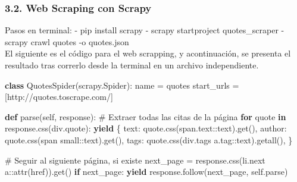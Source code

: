 \documentclass[
  letterpaper,
  DIV=11,
  numbers=noendperiod]{scrartcl}
\makeatletter
\newenvironment{Shaded}{\begin{snugshade}}{\end{snugshade}}
\newcommand{\CommentTok}[1]{\textcolor[rgb]{0.37,0.37,0.37}{#1}}
\newcommand{\ControlFlowTok}[1]{\textcolor[rgb]{0.00,0.23,0.31}{\textbf{#1}}}
\newcommand{\KeywordTok}[1]{\textcolor[rgb]{0.00,0.23,0.31}{\textbf{#1}}}
\newcommand{\NormalTok}[1]{\textcolor[rgb]{0.00,0.23,0.31}{#1}}
\newcommand{\OperatorTok}[1]{\textcolor[rgb]{0.37,0.37,0.37}{#1}}
\newcommand{\StringTok}[1]{\textcolor[rgb]{0.13,0.47,0.30}{#1}}
\newcommand{\VariableTok}[1]{\textcolor[rgb]{0.07,0.07,0.07}{#1}}
\newcommand*\pandocbounded[1]{%
  \sbox\pandoc@box{#1}%
  \Gscale@div\@tempa{\textheight}{\dimexpr\ht\pandoc@box+\dp\pandoc@box\relax}%
  \Gscale@div\@tempb{\linewidth}{\wd\pandoc@box}%
  \ifdim\@tempb\p@<\@tempa\p@\let\@tempa\@tempb\fi%
  \ifdim\@tempa\p@<\p@\scalebox{\@tempa}{\usebox\pandoc@box}%
  \else\usebox{\pandoc@box}%
  \fi%
}
\makeatother
\begin{document}
\pandocbounded{\texttt{[image: Imagen1.png]}}

\subsubsection{3.2. Web Scraping con
Scrapy}\label{web-scraping-con-scrapy}

Pasos en terminal: - pip install scrapy - scrapy startproject
quotes\_scraper - scrapy crawl quotes -o quotes.json\\
El siguiente es el código para el web scrapping, y acontinuación, se
presenta el resultado tras correrlo desde la terminal en un archivo
independiente.

\begin{Shaded}
\begin{Highlighting}[]

\KeywordTok{class}\NormalTok{ QuotesSpider(scrapy.Spider):}
\NormalTok{    name }\OperatorTok{=} \StringTok{\textquotesingle{}quotes\textquotesingle{}}
\NormalTok{    start\_urls }\OperatorTok{=}\NormalTok{ [}\StringTok{\textquotesingle{}http://quotes.toscrape.com/\textquotesingle{}}\NormalTok{]}

    \KeywordTok{def}\NormalTok{ parse(}\VariableTok{self}\NormalTok{, response):}
        \CommentTok{\# Extraer todas las citas de la página}
        \ControlFlowTok{for}\NormalTok{ quote }\KeywordTok{in}\NormalTok{ response.css(}\StringTok{\textquotesingle{}div.quote\textquotesingle{}}\NormalTok{):}
            \ControlFlowTok{yield}\NormalTok{ \{}
                \StringTok{\textquotesingle{}text\textquotesingle{}}\NormalTok{: quote.css(}\StringTok{\textquotesingle{}span.text::text\textquotesingle{}}\NormalTok{).get(),}
                \StringTok{\textquotesingle{}author\textquotesingle{}}\NormalTok{: quote.css(}\StringTok{\textquotesingle{}span small::text\textquotesingle{}}\NormalTok{).get(),}
                \StringTok{\textquotesingle{}tags\textquotesingle{}}\NormalTok{: quote.css(}\StringTok{\textquotesingle{}div.tags a.tag::text\textquotesingle{}}\NormalTok{).getall(),}
\NormalTok{            \}}

        \CommentTok{\# Seguir al siguiente página, si existe}
\NormalTok{        next\_page }\OperatorTok{=}\NormalTok{ response.css(}\StringTok{\textquotesingle{}li.next a::attr(href)\textquotesingle{}}\NormalTok{).get()}
        \ControlFlowTok{if}\NormalTok{ next\_page:}
            \ControlFlowTok{yield}\NormalTok{ response.follow(next\_page, }\VariableTok{self}\NormalTok{.parse)}
\end{Highlighting}
\end{Shaded}
\end{document}
